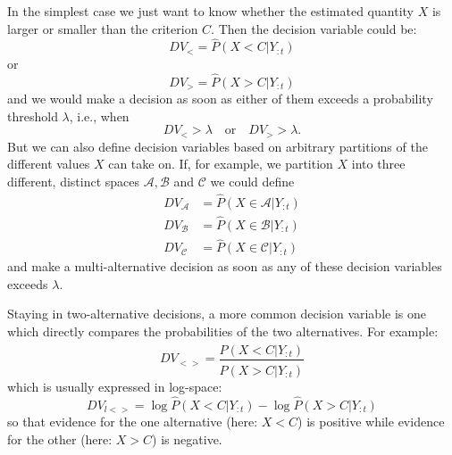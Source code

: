 \documentclass[10pt,a4paper]{article}
\begin{document}
In the simplest case we just want to know whether the estimated quantity $X$ is larger or smaller than the criterion $C$. Then the decision variable could be:
\begin{equation}
DV_< = \hat{P}(X < C | Y_{:t})
\end{equation}
or 
\begin{equation}
DV_> = \hat{P}(X > C | Y_{:t})
\end{equation}
and we would make a decision as soon as either of them exceeds a probability threshold $\lambda$, i.e., when
\begin{equation}
DV_< > \lambda \quad \mathrm{or} \quad DV_> > \lambda.
\end{equation}
But we can also define decision variables based on arbitrary partitions of the different values $X$ can take on. If, for example, we partition $X$ into three different, distinct spaces $\mathcal{A}, \mathcal{B}$ and $\mathcal{C}$ we could define
\begin{align}
DV_\mathcal{A} &= \hat{P}(X \in \mathcal{A} | Y_{:t})\\
DV_\mathcal{B} &= \hat{P}(X \in \mathcal{B} | Y_{:t})\\
DV_\mathcal{C} &= \hat{P}(X \in \mathcal{C} | Y_{:t})
\end{align}
and make a multi-alternative decision as soon as any of these decision variables exceeds $\lambda$.

Staying in two-alternative decisions, a more common decision variable is one which directly compares the probabilities of the two alternatives. For example:
\begin{equation}
DV_{<>} = \frac{\hat{P}(X < C | Y_{:t})}{\hat{P}(X > C | Y_{:t})}
\end{equation}
which is usually expressed in log-space:
\begin{equation}
DV_{l<>} = \log\hat{P}(X < C | Y_{:t}) - \log\hat{P}(X > C | Y_{:t})
\end{equation}
so that evidence for the one alternative (here: $X < C$) is positive while evidence for the other (here: $X > C$) is negative.
\end{document}
